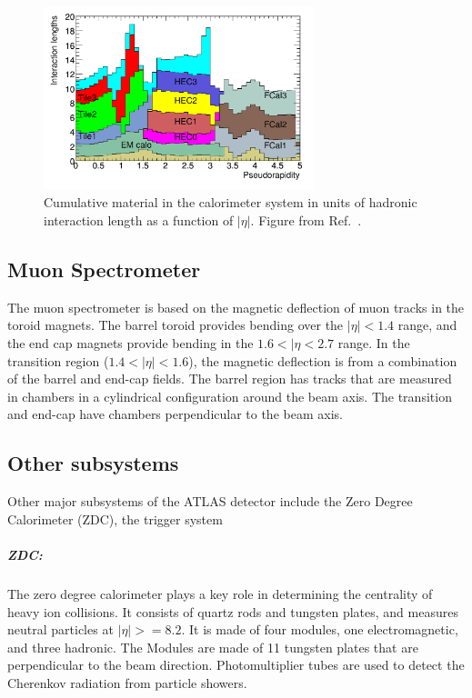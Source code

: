 \begin{figure}[ht]
	\centering
        \includegraphics[width=0.7\textwidth]{figures/setup/interaction_lengths}
          \caption{Cumulative material in the calorimeter system in units of hadronic interaction length as a function of $|\eta|$.
          Figure from Ref.~\cite{Aad:2008zzm}.}
          \label{fig:interaction_lenghts}
\end{figure}


\subsection{Muon Spectrometer}
The muon spectrometer is based on the magnetic deflection of muon tracks in the toroid magnets.
The barrel toroid provides bending over the $|\eta| < 1.4$ range, and the end cap magnets provide bending in the $1.6 < |\eta < 2.7$ range.
In the transition region ($1.4 < |\eta| < 1.6$), the magnetic deflection is from a combination of the barrel and end-cap fields.
The barrel region has tracks that are measured in chambers in a cylindrical configuration around the beam axis.
The transition and end-cap have chambers perpendicular to the beam axis.



\subsection{Other subsystems}
Other major subsystems of the ATLAS detector include the Zero Degree Calorimeter (ZDC), the trigger system

\subparagraph{ZDC: }
The zero degree calorimeter plays a key role in determining the centrality of heavy ion collisions.
It consists of quartz rods and tungsten plates, and measures neutral particles at $|\eta| >= 8.2$.
It is made of four modules, one electromagnetic, and three hadronic.
The Modules are made of 11 tungsten plates that are perpendicular to the beam direction.
Photomultiplier tubes are used to detect the Cherenkov radiation from particle showers.


